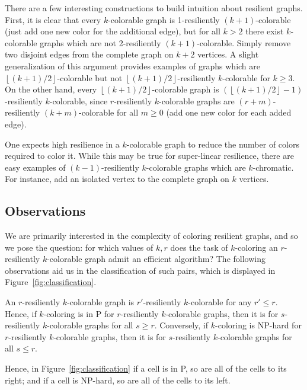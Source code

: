 There are a few interesting constructions to build intuition about resilient
graphs. First, it is clear that every $k$-colorable graph is 1-resiliently
$(k+1)$-colorable (just add one new color for the additional edge), but for all
$k > 2$ there exist $k$-colorable graphs which are not 2-resiliently
$(k+1)$-colorable. Simply remove two disjoint edges from the complete graph on
$k+2$ vertices. A slight generalization of this argument provides examples of
graphs which are $\left \lfloor (k+1)/2\right \rfloor$-colorable but not $\left
\lfloor (k+1)/2 \right \rfloor$-resiliently $k$-colorable for $k \geq 3$.  On
the other hand, every $\left \lfloor (k+1)/2\right \rfloor$-colorable graph is
$(\left \lfloor (k+1)/2 \right \rfloor-1)$-resiliently $k$-colorable, since
$r$-resiliently $k$-colorable graphs are $(r+m)$-resiliently $(k+m)$-colorable
for all $m \geq 0$ (add one new color for each added edge). 

One expects high resilience in a $k$-colorable graph to reduce the number of
colors required to color it. While this may be true for super-linear
resilience, there are easy examples of $(k-1)$-resiliently $k$-colorable graphs
which are $k$-chromatic. For instance, add an isolated vertex to the complete
graph on $k$ vertices. 

\subsection{Observations}

We are primarily interested in the complexity of coloring resilient graphs, and
so we pose the question: for which values of $k,r$ does the task of
$k$-coloring an $r$-resiliently $k$-colorable graph admit an efficient
algorithm? The following observations aid us in the classification of such
pairs, which is displayed in Figure~\ref{fig:classification}.

\begin{observation}\label{observation:horizontal}
An $r$-resiliently $k$-colorable graph is $r'$-resiliently $k$-colorable for
any $r' \leq r$. Hence, if $k$-coloring is in P for $r$-resiliently
$k$-colorable graphs, then it is for $s$-resiliently $k$-colorable graphs for
all $s \geq r$.  Conversely, if $k$-coloring is NP-hard for $r$-resiliently
$k$-colorable graphs, then it is for $s$-resiliently $k$-colorable graphs for
all $s \leq r$. 
\end{observation}

Hence, in Figure~\ref{fig:classification} if a cell is in P, so are all of the
cells to its right; and if a cell is NP-hard, so are all of the cells to its
left. 

